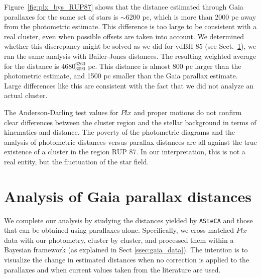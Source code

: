 \documentclass[draft]{aa}
\begin{document}
Figure~\ref{fig:plx_bys_RUP87} shows that the distance estimated through
Gaia parallaxes for the same set of stars is $\sim6200$ pc, which is more
than 2000 pc away from the photometric estimate. This difference is too large to
be consistent with a real cluster, even when possible offsets are taken into account.
We determined whether this discrepancy might be solved as we did for vdBH 85 (see
Sect.~\ref{sec:gaia_distances}), we ran the same analysis with
Bailer-Jones distances. The resulting weighted average for the
distance is $4680_{3090}^{6260}$ pc. This distance is almost 800 pc larger
than the photometric estimate, and 1500 pc smaller than the Gaia parallax
estimate. Large differences like this are consistent with the fact that we did not
analyze an actual cluster.

The Anderson-Darling test values for $Plx$ and proper motions do not confirm
clear differences between the cluster region and the stellar background in
terms of kinematics and distance. The poverty of the photometric diagrams and
the analysis of photometric distances versus parallax distances
are all against the true existence of a cluster in the region RUP 87.
In our interpretation, this is not a real entity, but the fluctuation of the star
field.





\section{Analysis of Gaia parallax distances}
\label{sec:gaia_distances}

We complete our analysis by studying the distances yielded
by \texttt{ASteCA} and those that can be obtained using parallaxes alone.
Specifically, we cross-matched $Plx$ data with our photometry, cluster by
cluster, and processed them within a Bayesian framework (as explained in Sect
\ref{ssec:gaia_data}). The intention is to visualize the change in estimated
distances when no correction is applied to the parallaxes and when current
values taken from the literature are used.\\
\end{document}
